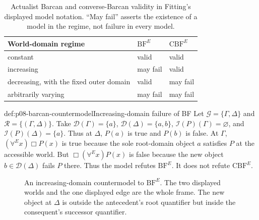 \begin{table}[!htbp]
\centering
\begin{tabular}{@{}lll@{}}
\toprule
World-domain regime & \(\mathrm{BF}^{E}\) & \(\mathrm{CBF}^{E}\) \\
\midrule
constant & valid & valid \\
increasing & may fail & valid \\
decreasing, with the fixed outer domain & valid & may fail \\
arbitrarily varying & may fail & may fail \\
\bottomrule
\end{tabular}
\caption{Actualist Barcan and converse-Barcan validity in Fitting's displayed
model notation.  ``May fail'' asserts the existence of a
model in the regime, not failure in every model.}
\label{tab:p08-barcan-domains}
\end{table}

\begin{hbexample}{def:p08-barcan-countermodel}{Increasing-domain failure of BF}
Let \(\mathcal G=\{\Gamma,\Delta\}\) and
\(\mathcal R=\{(\Gamma,\Delta)\}\).  Take
\(\mathcal D(\Gamma)=\{a\}\),
\(\mathcal D(\Delta)=\{a,b\}\),
\(\mathcal I(P)(\Gamma)=\varnothing\), and
\(\mathcal I(P)(\Delta)=\{a\}\).  Thus at \(\Delta\), \(P(a)\) is true and
\(P(b)\) is false.  At \(\Gamma\),
\((\forall^{E}x)\Box P(x)\) is true because the sole root-domain
object \(a\) satisfies \(P\) at the accessible world.  But
\(\Box(\forall^{E}x)P(x)\) is false because the new object
\(b\in\mathcal D(\Delta)\) fails \(P\) there.  Thus the model refutes
\(\mathrm{BF}^{E}\).  It does not refute \(\mathrm{CBF}^{E}\).
\end{hbexample}

\begin{figure}[!htbp]
\centering
{}
\caption{An increasing-domain countermodel to \(\mathrm{BF}^{E}\).  The two
displayed worlds and the one displayed edge are the whole frame.  The new
object at \(\Delta\) is outside the antecedent's root quantifier but inside the
consequent's successor quantifier.}
\label{fig:p08-barcan-countermodel}
\end{figure}

